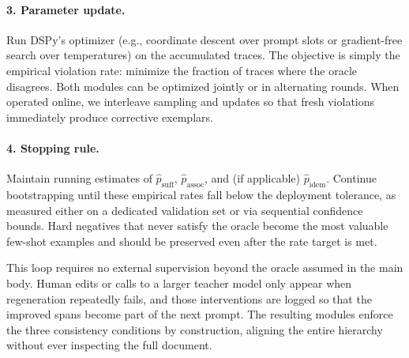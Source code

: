 \paragraph{3. Parameter update.} Run DSPy's optimizer (e.g., coordinate descent over prompt slots or gradient-free search over temperatures) on the accumulated traces. The objective is simply the empirical violation rate: minimize the fraction of traces where the oracle disagrees. Both modules can be optimized jointly or in alternating rounds. When operated online, we interleave sampling and updates so that fresh violations immediately produce corrective exemplars.

\paragraph{4. Stopping rule.} Maintain running estimates of $\hat{p}_{\text{suff}}$, $\hat{p}_{\text{assoc}}$, and (if applicable) $\hat{p}_{\text{idem}}$. Continue bootstrapping until these empirical rates fall below the deployment tolerance, as measured either on a dedicated validation set or via sequential confidence bounds. Hard negatives that never satisfy the oracle become the most valuable few-shot examples and should be preserved even after the rate target is met.

This loop requires no external supervision beyond the oracle assumed in the main body. Human edits or calls to a larger teacher model only appear when regeneration repeatedly fails, and those interventions are logged so that the improved spans become part of the next prompt. The resulting modules enforce the three consistency conditions by construction, aligning the entire hierarchy without ever inspecting the full document.
